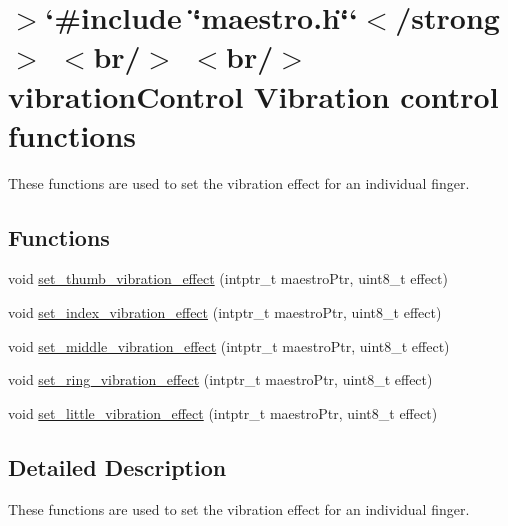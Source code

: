 \hypertarget{group__strong}{}\section{$>$`\#include \char`\"{}maestro.\+h\char`\"{}`$<$/strong$>$ $<$br/$>$ $<$br/$>$ vibration\+Control Vibration control functions}
\label{group__strong}


These functions are used to set the vibration effect for an individual finger.  


\subsection*{Functions}
\begin{DoxyCompactItemize}
\item 
void \hyperlink{group__strong_ga2cade8fb792cc25e14176898ba9b70d5}{set\+\_\+thumb\+\_\+vibration\+\_\+effect} (intptr\+\_\+t maestro\+Ptr, uint8\+\_\+t effect)
\item 
void \hyperlink{group__strong_ga1574bdd826660ba522e6a9e527b912d5}{set\+\_\+index\+\_\+vibration\+\_\+effect} (intptr\+\_\+t maestro\+Ptr, uint8\+\_\+t effect)
\item 
void \hyperlink{group__strong_gac5e818c55bae4cc053575cf56da645f6}{set\+\_\+middle\+\_\+vibration\+\_\+effect} (intptr\+\_\+t maestro\+Ptr, uint8\+\_\+t effect)
\item 
void \hyperlink{group__strong_ga8fbe7c8a6e2d9566023c31d0da891d74}{set\+\_\+ring\+\_\+vibration\+\_\+effect} (intptr\+\_\+t maestro\+Ptr, uint8\+\_\+t effect)
\item 
void \hyperlink{group__strong_gacfdcd1bab70eb2248b3e94c7653516f2}{set\+\_\+little\+\_\+vibration\+\_\+effect} (intptr\+\_\+t maestro\+Ptr, uint8\+\_\+t effect)
\end{DoxyCompactItemize}


\subsection{Detailed Description}
These functions are used to set the vibration effect for an individual finger. 



